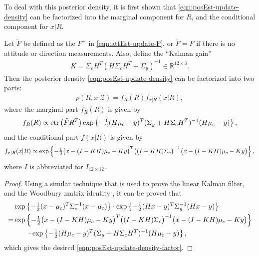 To deal with this posterior density, it is first shown that \eqref{eqn:posEst-update-density} can be factorized into the marginal component for $R$, and the conditional component for $x|R$.
\begin{lemma} \label{lemma:posEst-update-factor}
	Let $\tilde{F}$ be defined as the $F^+$ in \eqref{eqn:attEst-update-F}, or $\tilde{F} = F$ if there is no attitude or direction measurements.
	Also, define the ``Kalman gain''
	\begin{align}
		K = \Sigma_cH^T(H\Sigma_cH^T + \Sigma_y)^{-1} \in \mathbb{R}^{12\times 3}.
	\end{align}
	Then the posterior density \eqref{eqn:posEst-update-density} can be factorized into two parts:
	\begin{align} \label{eqn:posEst-update-density-factor}
		p(R,x|\mathcal{Z}) = f_R(R) f_{x|R}(x|R),
	\end{align}
	where the marginal part $f_R(R)$ is given by
	\begin{align} \label{eqn:posEst-update-density-R}
		f_R(R) \propto \mathrm{etr}\left( \tilde{F}R^T \right) \exp\left\{ -\tfrac{1}{2}(H\mu_c-y)^T (\Sigma_y+H\Sigma_cH^T)^{-1} (H\mu_c-y) \right\},
	\end{align}
	and the conditional part $f(x|R)$ is given by
	\begin{align} \label{eqn:posEst-update-density-x|R}
		f_{x|R}(x|R) \propto \exp\left\{ -\tfrac{1}{2} \big(x-(I-KH)\mu_c-Ky\big)^T \big((I-KH)\Sigma_c\big)^{-1} \big(x-(I-KH)\mu_c-Ky\big) \right\},
	\end{align}
	where $I$ is abbreviated for $I_{12\times 12}$.
\end{lemma}
\begin{proof}
	Using a similar technique that is used to prove the linear Kalman filter, and the Woodbury matrix identity \cite{petersen2008matrix}, it can be proved that
	\begin{align*}
		&\exp\left\{ -\tfrac{1}{2}(x-\mu_c)^T\Sigma_c^{-1}(x-\mu_c) \right\} \cdot \exp\left\{ -\tfrac{1}{2}(Hx-y)^T\Sigma_y^{-1}(Hx-y) \right\} \\
		= &\exp\left\{ -\tfrac{1}{2} \big(x-(I-KH)\mu_c-Ky\big)^T \big((I-KH)\Sigma_c\big)^{-1} \big(x-(I-KH)\mu_c-Ky\big) \right\} \\
		&\qquad \cdot \exp\left\{ -\tfrac{1}{2}(H\mu_c-y)^T (\Sigma_y+H\Sigma_cH^T)^{-1} (H\mu_c-y) \right\},
	\end{align*}
	which gives the desired \eqref{eqn:posEst-update-density-factor}.
\end{proof}

